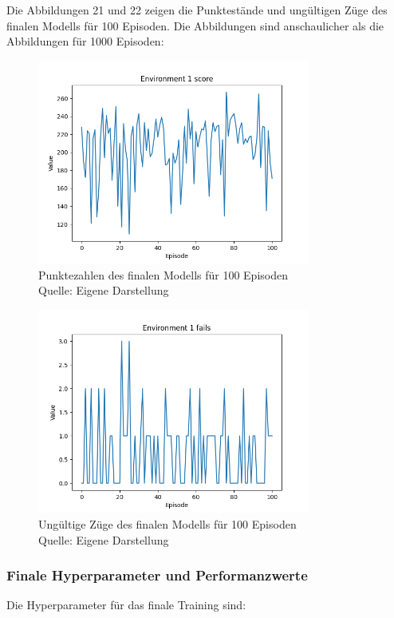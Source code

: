 Die Abbildungen 21 und 22 zeigen die Punktestände und ungültigen Züge des finalen Modells für 100 Episoden. Die Abbildungen sind anschaulicher als die Abbildungen für 1000 Episoden:
\nopagebreak
\begin{figure}[H]
	\centering
	\includegraphics[width=0.8\textwidth]{Bilder/final4000steps} 
	\caption[Punktezahlen des finalen Modells für 100 Episoden]{Punktezahlen des finalen Modells für 100 Episoden\\ Quelle: Eigene Darstellung}
\end{figure}
\begin{figure}[H]
	\centering
	\includegraphics[width=0.8\textwidth]{Bilder/final4000stepsf} 
	\caption[Ungültige Züge des finalen Modells für 100 Episoden]{Ungültige Züge des finalen Modells für 100 Episoden\\ Quelle: Eigene Darstellung}
\end{figure}
\subsubsection{Finale Hyperparameter und Performanzwerte}
Die Hyperparameter für das finale Training sind:

